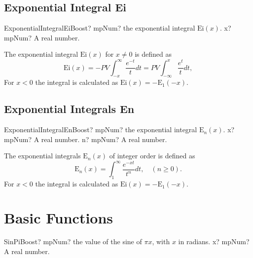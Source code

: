 \subsection{Exponential Integral Ei}
\label{Exponential Integral Ei}

\begin{mpFunctionsExtract}
	\mpFunctionOne
	{ExponentialIntegralEiBoost? mpNum? the exponential integral $\text{Ei}(x)$.}
	{x? mpNum? A real number.}
\end{mpFunctionsExtract}

\vspace{0.3cm}
The exponential integral $\text{Ei}(x)$ for $x \neq 0$ is defined as
\begin{equation}
	\text{Ei}(x) = -PV \int_{-x}^\infty \frac{e^{-t}}{t} dt= PV \int_{-\infty}^x \frac{e^{t}}{t} dt,
\end{equation}
For $x<0$ the integral is calculated as $\text{Ei}(x) = -\text{E}_1(-x)$. 




\subsection{Exponential Integrals En}
\label{Exponential Integrals En}

\begin{mpFunctionsExtract}
	\mpFunctionTwo
	{ExponentialIntegralEnBoost? mpNum? the exponential integral  $\text{E}_n(x)$.}
	{x? mpNum? A real number.}
	{n? mpNum? A real number.}
\end{mpFunctionsExtract}

\vspace{0.3cm}
The exponential integrals $\text{E}_n(x)$ of integer order is defined as
\begin{equation}
	\text{E}_n(x) = \int_{1}^{\infty} \frac{e^{-xt}}{t^n} dt, \quad (n \geq 0).
\end{equation}
For $x<0$ the integral is calculated as $\text{Ei}(x) = -\text{E}_1(-x)$. 


\section{Basic Functions}

\begin{mpFunctionsExtract}
	\mpFunctionOne
	{SinPiBoost? mpNum? the value of the sine of $\pi x$, with $x$ in radians.}
	{x? mpNum? A real number.}
\end{mpFunctionsExtract}



